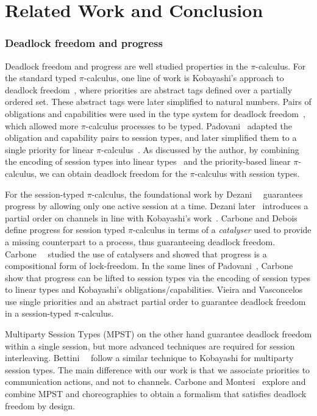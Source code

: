\documentclass[main.tex]{subfiles}
\begin{document}
\section{Related Work and Conclusion}
\subsubsection*{Deadlock freedom and progress}
Deadlock freedom and progress are well studied properties in the $\pi$-calculus.
For the standard typed $\pi$-calculus, one line of work is Kobayashi's approach to deadlock freedom~\cite{kobayashi98}, where priorities are abstract tags defined over a partially ordered set. These abstract tags were later simplified to natural numbers. Pairs of obligations and capabilities were used in the type system for deadlock freedom~\cite{kobayashi06}, which allowed more $\pi$-calculus processes to be typed. Padovani~\cite{padovani13} adapted the obligation and capability pairs to session types, and later simplified them to a single priority for linear $\pi$-calculus~\cite{padovani14}.  As discussed by the author, by combining the encoding of session types into linear types~\cite{kobayashi07,dardhagiachino12,dardha14beat,dardha16} and the priority-based linear $\pi$-calculus, we can obtain deadlock freedom for the $\pi$-calculus with session types.

For the session-typed $\pi$-calculus, the foundational work by Dezani~\etal~\cite{dezani-ciancaglinimostrous06} guarantees progress by allowing only one active session at a time. Dezani later~\cite{dezani-ciancagliniliguoro09progress} introduces a partial order on channels in line with Kobayashi's work~\cite{kobayashi98}. Carbone and Debois~\cite{carbonedebois10} define progress for session typed $\pi$-calculus in terms of a \emph{catalyser} used to provide a missing counterpart to a process, thus guaranteeing deadlock freedom.
Carbone~\etal~\cite{carbonedardha14} studied the use of catalysers and showed that progress is a compositional form of lock-freedom. In the same lines of Padovani~\cite{padovani14}, Carbone~\etal~\cite{carbonedardha14} show that progress can be lifted to session types via the encoding of session types to linear types and Kobayashi's obligations/capabilities. Vieira and Vasconcelos~\cite{vieiravasconcelos13} use single priorities and an abstract partial order to guarantee deadlock freedom in a session-typed $\pi$-calculus.

Multiparty Session Types (MPST) \cite{hondayoshida08} on the other hand guarantee deadlock freedom within a single session, but more advanced techniques are required for session interleaving. Bettini~\etal~\cite{bettinicoppo08} follow a similar technique to Kobayashi for multiparty session types. The main
difference with our work is that we associate priorities to communication actions, and not to channels. Carbone and Montesi~\cite{carbonemontesi13} explore and combine MPST and choreographies to obtain a formalism that satisfies deadlock freedom by design.
\end{document}
